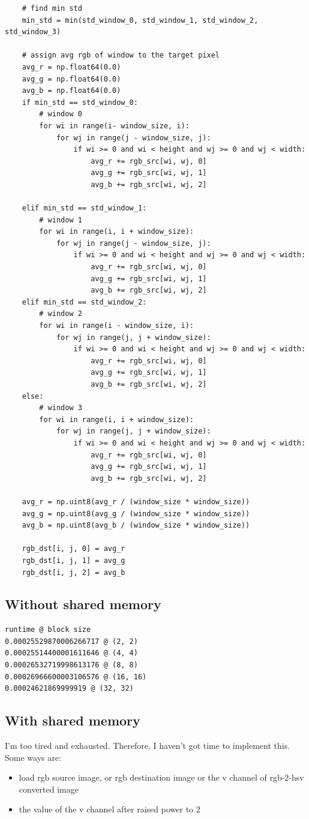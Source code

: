 \documentclass{article}
\begin{document}
\begin{verbatim}
    # find min std
    min_std = min(std_window_0, std_window_1, std_window_2, std_window_3)
    
    # assign avg rgb of window to the target pixel
    avg_r = np.float64(0.0)
    avg_g = np.float64(0.0)
    avg_b = np.float64(0.0)
    if min_std == std_window_0:
        # window 0
        for wi in range(i- window_size, i):
            for wj in range(j - window_size, j):
                if wi >= 0 and wi < height and wj >= 0 and wj < width:
                    avg_r += rgb_src[wi, wj, 0]
                    avg_g += rgb_src[wi, wj, 1]
                    avg_b += rgb_src[wi, wj, 2]
                
    elif min_std == std_window_1:
        # window 1
        for wi in range(i, i + window_size):
            for wj in range(j - window_size, j):
                if wi >= 0 and wi < height and wj >= 0 and wj < width:
                    avg_r += rgb_src[wi, wj, 0]
                    avg_g += rgb_src[wi, wj, 1]
                    avg_b += rgb_src[wi, wj, 2]
    elif min_std == std_window_2:
        # window 2
        for wi in range(i - window_size, i):
            for wj in range(j, j + window_size):
                if wi >= 0 and wi < height and wj >= 0 and wj < width:
                    avg_r += rgb_src[wi, wj, 0]
                    avg_g += rgb_src[wi, wj, 1]
                    avg_b += rgb_src[wi, wj, 2]
    else:
        # window 3
        for wi in range(i, i + window_size):
            for wj in range(j, j + window_size):
                if wi >= 0 and wi < height and wj >= 0 and wj < width:
                    avg_r += rgb_src[wi, wj, 0]
                    avg_g += rgb_src[wi, wj, 1]
                    avg_b += rgb_src[wi, wj, 2]
    
    avg_r = np.uint8(avg_r / (window_size * window_size))
    avg_g = np.uint8(avg_g / (window_size * window_size))
    avg_b = np.uint8(avg_b / (window_size * window_size))
    
    rgb_dst[i, j, 0] = avg_r
    rgb_dst[i, j, 1] = avg_g
    rgb_dst[i, j, 2] = avg_b

\end{verbatim}

\subsection{Without shared memory}
\begin{verbatim}
runtime @ block size
0.00025529870006266717 @ (2, 2)
0.00025514400001611646 @ (4, 4)
0.00026532719998613176 @ (8, 8)
0.00026966600003106576 @ (16, 16)
0.00024621869999919 @ (32, 32)
\end{verbatim}
\subsection{With shared memory}
I'm too tired and exhausted. Therefore, I haven't got time to implement this. Some ways are:
\begin{itemize}
    \item load rgb source image, or rgb destination image or the v channel of rgb-2-hsv converted image
    \item the value of the v channel after raised power to 2
\end{itemize}
\end{document}
